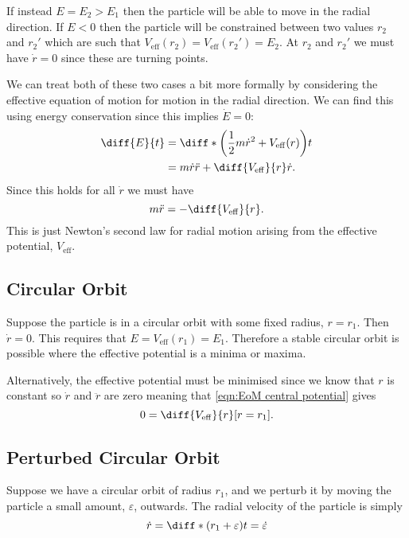 \documentclass[fleqn]{NotesClass}
\newcommand*{\eff}{\mathrm{eff}}
\begin{document}
    If instead \(E = E_2 > E_1\) then the particle will be able to move in the radial direction.
    If \(E < 0\) then the particle will be constrained between two values \(r_2\) and \(r_2'\) which are such that \(V_{\eff}(r_2) = V_{\eff}(r_2') = E_2\).
    At \(r_2\) and \(r_2'\) we must have \(\dot{r} = 0\) since these are turning points.
    
    We can treat both of these two cases a bit more formally by considering the effective equation of motion for motion in the radial direction.
    We can find this using energy conservation since this implies \(\dot{E} = 0\):
    \begin{align}
        \diff{E}{t} &= \diff*{\left( \frac{1}{2}m\dot{r}^2 + V_{\eff}(r) \right)}{t}\\
        &= m\dot{r}\ddot{r} + \diff{V_{\eff}}{r}\dot{r}.
    \end{align}
    Since this holds for all \(\dot{r}\) we must have
    \begin{equation}
        m\ddot{r} = -\diff{V_{\eff}}{r}.\label{eqn:EoM central potential}
    \end{equation}
    This is just Newton's second law for radial motion arising from the effective potential, \(V_{\eff}\).
    
    \subsection{Circular Orbit}
    Suppose the particle is in a circular orbit with some fixed radius, \(r = r_1\).
    Then \(\dot{r} = 0\).
    This requires that \(E = V_{\eff}(r_1) = E_1\).
    Therefore a stable circular orbit is possible where the effective potential is a minima or maxima.
    
    Alternatively, the effective potential must be minimised since we know that \(r\) is constant so \(\dot{r}\) and \(\ddot{r}\) are zero meaning that \cref{eqn:EoM central potential} gives
    \begin{equation}
        0=\diff{V_{\eff}}{r}[r=r_1].
    \end{equation}
    
    \subsection{Perturbed Circular Orbit}
    Suppose we have a circular orbit of radius \(r_1\), and we perturb it by moving the particle a small amount, \(\varepsilon\), outwards.
    The radial velocity of the particle is simply
    \begin{equation}
        \dot{r} = \diff*{(r_1 + \varepsilon)}{t} = \dot{\varepsilon}
    \end{equation}
\end{document}
